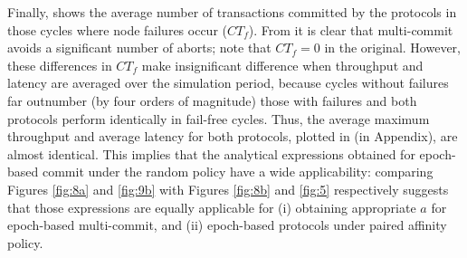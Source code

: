 Finally,  shows the average number of transactions committed by the protocols in those cycles 
where node failures occur ($CT_f$). 
From  it is clear that multi-commit avoids a significant 
number of aborts; note that $CT_f = 0$ in the original. %
However, these differences in $CT_f$ make insignificant difference when 
throughput and latency are averaged over the simulation period,  
because cycles without failures far outnumber (by four orders of magnitude) those with failures and both protocols perform identically in fail-free cycles. 
Thus, the average maximum throughput and average
latency for both protocols, plotted in  (in Appendix), are almost identical. 
This implies
that 
the analytical expressions obtained for epoch-based commit under the random policy have a wide applicability:
comparing Figures \ref{fig:8a} and \ref{fig:9b} with Figures \ref{fig:8b} and \ref{fig:5}
respectively suggests that those expressions are equally applicable for (i)
obtaining appropriate $a$ for epoch-based multi-commit, and (ii) epoch-based protocols under paired affinity policy. 
